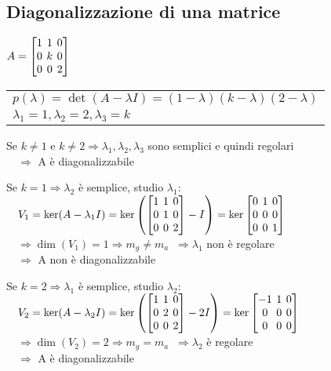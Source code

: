\subsection{Diagonalizzazione di una matrice}
$
A = \left[
	\arraycolsep=2.0pt\def\arraystretch{1.0}
	\begin{array}{@{}ccc@{}}
		1 & 1 & 0 \\
		0 & k & 0\\
		0 & 0 & 2\\
	\end{array}
\right]
$
\begin{tabular}{l}
	$p(\lambda) = \det(A-\lambda I) = (1-\lambda)(k-\lambda)(2-\lambda)$ \\
	$\lambda_1 = 1, \lambda_2 = 2, \lambda_3 = k$
\end{tabular}

Se $k\neq1$ e $k\neq2 \Rightarrow \lambda_1, \lambda_2, \lambda_3$ sono semplici e quindi regolari \\
$\quad\Rightarrow$ A è diagonalizzabile

Se $k = 1 \Rightarrow \lambda_2$ è semplice, studio $\lambda_1$: \\
$\quad V_1 = \ker(A-\lambda_1I) = \ker
\left(
	\left[
		\arraycolsep=2.0pt\def\arraystretch{1.0}
		\begin{array}{@{}ccc@{}}
			1 & 1 & 0 \\
			0 & 1 & 0\\
			0 & 0 & 2\\
		\end{array}
	\right] - I 
\right) = \ker
\left[
	\arraycolsep=2.0pt\def\arraystretch{1.0}
	\begin{array}{@{}ccc@{}}
		0 & 1 & 0 \\
		0 & 0 & 0\\
		0 & 0 & 1\\
	\end{array}
\right]$ \\
$\quad \Rightarrow \dim(V_1) = 1 \Rightarrow m_g \neq m_a$
$\ \Rightarrow \lambda_1$ non è regolare \\
$\quad \Rightarrow$ A non è diagonalizzabile


Se $k = 2 \Rightarrow \lambda_1$ è semplice, studio $\lambda_2$:\\
$\quad V_2 = \ker(A-\lambda_2I) = \ker
\left(
	\left[
		\arraycolsep=2.0pt\def\arraystretch{1.0}
		\begin{array}{@{}ccc@{}}
			1 & 1 & 0 \\
			0 & 2 & 0\\
			0 & 0 & 2\\
		\end{array}
	\right] - 2I 
\right) = \ker
\left[
	\arraycolsep=2.0pt\def\arraystretch{1.0}
	\begin{array}{@{}ccc@{}}
		-1 & 1 & 0 \\
		0 & 0 & 0\\
		0 & 0 & 0\\
	\end{array}
\right]$ \\
$\quad \Rightarrow \dim(V_2) = 2 \Rightarrow m_g = m_a$
$\ \Rightarrow \lambda_2$ è regolare \\
$\quad \Rightarrow$ A è diagonalizzabile
